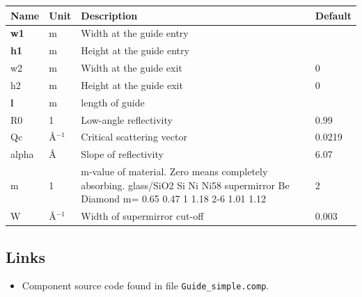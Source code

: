 \begin{longtable}{p{}p{}p{}p{}}
\toprule
\textbf{Name} & \textbf{Unit} & \textbf{Description} & \textbf{Default} \\
\midrule
\endhead
\textbf{w1} & m & Width at the guide entry &  \\
\textbf{h1} & m & Height at the guide entry &  \\
w2 & m & Width at the guide exit & 0 \\
h2 & m & Height at the guide exit & 0 \\
\textbf{l} & m & length of guide &  \\
R0 & 1 & Low-angle reflectivity & 0.99 \\
Qc & \AA{}$^{-1}$ & Critical scattering vector & 0.0219 \\
alpha & \AA{} & Slope of reflectivity & 6.07 \\
m & 1 & m-value of material. Zero means completely absorbing. glass/SiO2 Si Ni Ni58 supermirror Be Diamond m=  0.65 0.47 1 1.18 2-6 1.01 1.12 & 2 \\
W & \AA{}$^{-1}$ & Width of supermirror cut-off & 0.003 \\
\bottomrule
\end{longtable}

\subsection*{Links}
\begin{itemize}
  \item Component source code found in file \texttt{Guide\_simple.comp}.
\end{itemize}

